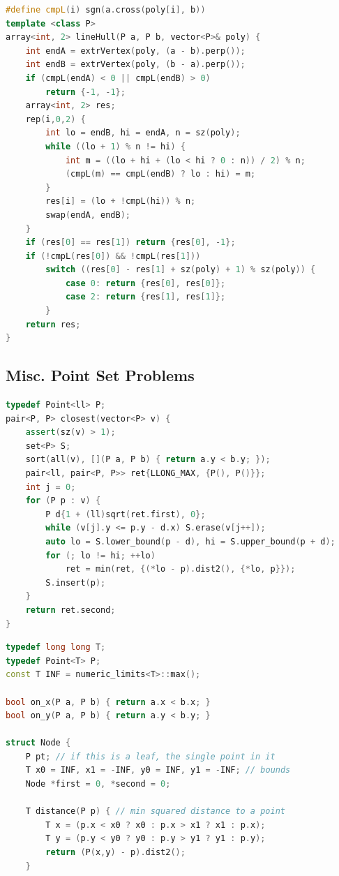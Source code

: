 \begin{multicols}{\Columns}
\begin{lstlisting}[language=C++]
#define cmpL(i) sgn(a.cross(poly[i], b))
template <class P>
array<int, 2> lineHull(P a, P b, vector<P>& poly) {
	int endA = extrVertex(poly, (a - b).perp());
	int endB = extrVertex(poly, (b - a).perp());
	if (cmpL(endA) < 0 || cmpL(endB) > 0)
		return {-1, -1};
	array<int, 2> res;
	rep(i,0,2) {
		int lo = endB, hi = endA, n = sz(poly);
		while ((lo + 1) % n != hi) {
			int m = ((lo + hi + (lo < hi ? 0 : n)) / 2) % n;
			(cmpL(m) == cmpL(endB) ? lo : hi) = m;
		}
		res[i] = (lo + !cmpL(hi)) % n;
		swap(endA, endB);
	}
	if (res[0] == res[1]) return {res[0], -1};
	if (!cmpL(res[0]) && !cmpL(res[1]))
		switch ((res[0] - res[1] + sz(poly) + 1) % sz(poly)) {
			case 0: return {res[0], res[0]};
			case 2: return {res[1], res[1]};
		}
	return res;
}
\end{lstlisting}


\subsection{Misc. Point Set Problems}
\begin{lstlisting}[language=C++]
typedef Point<ll> P;
pair<P, P> closest(vector<P> v) {
	assert(sz(v) > 1);
	set<P> S;
	sort(all(v), [](P a, P b) { return a.y < b.y; });
	pair<ll, pair<P, P>> ret{LLONG_MAX, {P(), P()}};
	int j = 0;
	for (P p : v) {
		P d{1 + (ll)sqrt(ret.first), 0};
		while (v[j].y <= p.y - d.x) S.erase(v[j++]);
		auto lo = S.lower_bound(p - d), hi = S.upper_bound(p + d);
		for (; lo != hi; ++lo)
			ret = min(ret, {(*lo - p).dist2(), {*lo, p}});
		S.insert(p);
	}
	return ret.second;
}
\end{lstlisting}

\begin{lstlisting}[language=C++]
typedef long long T;
typedef Point<T> P;
const T INF = numeric_limits<T>::max();

bool on_x(P a, P b) { return a.x < b.x; }
bool on_y(P a, P b) { return a.y < b.y; }

struct Node {
	P pt; // if this is a leaf, the single point in it
	T x0 = INF, x1 = -INF, y0 = INF, y1 = -INF; // bounds
	Node *first = 0, *second = 0;

	T distance(P p) { // min squared distance to a point
		T x = (p.x < x0 ? x0 : p.x > x1 ? x1 : p.x);
		T y = (p.y < y0 ? y0 : p.y > y1 ? y1 : p.y);
		return (P(x,y) - p).dist2();
	}


\end{lstlisting}
\end{multicols}
